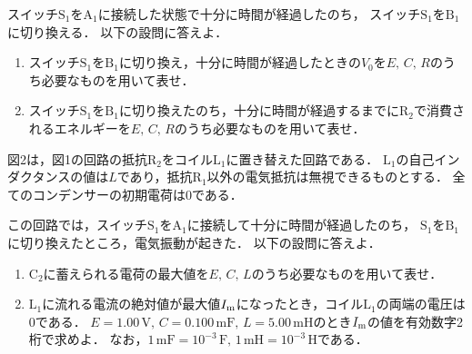 スイッチ$\text{S}_1$を$\text{A}_1$に接続した状態で十分に時間が経過したのち，
スイッチ$\text{S}_1$を$\text{B}_1$に切り換える．
以下の設問に答えよ．

\begin{enumerate}[（1）]
  \setlength{\leftskip}{-1zw}
  \setlength{\itemindent}{1zw}\setlength{\labelsep}{0.5zw}
  \setlength{\labelwidth}{1zw}\setlength{\leftmargin}{1zw}
  \setlength{\itemsep}{0.5\baselineskip}
  \addtocounter{enumi}{3}
  \item スイッチ$\text{S}_1$を$\text{B}_1$に切り換え，十分に時間が経過したときの$V_0$を$E,\,C,\,R$のうち必要なものを用いて表せ．
  \item スイッチ$\text{S}_1$を$\text{B}_1$に切り換えたのち，十分に時間が経過するまでに$\text{R}_2$で消費されるエネルギーを$E,\,C,\,R$のうち必要なものを用いて表せ．
\end{enumerate}



図2は，図1の回路の抵抗$\text{R}_2$をコイル$\text{L}_1$に置き替えた回路である．
$\text{L}_1$の自己インダクタンスの値は$L$であり，抵抗$\text{R}_1$以外の電気抵抗は無視できるものとする．
全てのコンデンサーの初期電荷は$0$である．

この回路では，スイッチ$\text{S}_1$を$\text{A}_1$に接続して十分に時間が経過したのち，
$\text{S}_1$を$\text{B}_1$に切り換えたところ，電気振動が起きた．
以下の設問に答えよ．

\begin{enumerate}[（1）]
  \setlength{\leftskip}{-1zw}
  \setlength{\itemindent}{1zw}\setlength{\labelsep}{0.5zw}
  \setlength{\labelwidth}{1zw}\setlength{\leftmargin}{1zw}
  \setlength{\itemsep}{0.5\baselineskip}
  \addtocounter{enumi}{5}
  \item $\text{C}_2$に蓄えられる電荷の最大値を$E,\,C,\,L$のうち必要なものを用いて表せ．
  \item $\text{L}_1$に流れる電流の絶対値が最大値$I_{\rm m}$になったとき，コイル$\text{L}_1$の両端の電圧は0である．
  $E=1.00\,\text{V},\,C=0.100\,\text{mF},\,L=5.00\,\text{mH}$のとき$I_{\rm m}$の値を有効数字2桁で求めよ．
  なお，$1\,\text{mF}=10^{-3}\,\text{F},\,1\,\text{mH}=10^{-3}\,\text{H}$である．
\end{enumerate}

